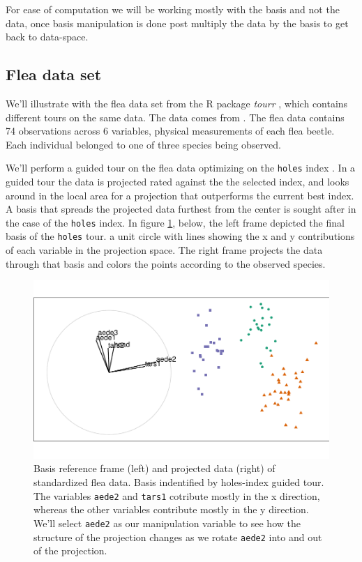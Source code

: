\documentclass{monashthesis}
\begin{document}
For ease of computation we will be working mostly with the basis and not the data, once basis manipulation is done post multiply the data by the basis to get back to data-space.

\hypertarget{flea-data-set}{%
\subsection{Flea data set}\label{flea-data-set}}

We'll illustrate with the flea data set from the R package \emph{tourr} \autocite{wickham_tourr_2011}, which contains different tours on the same data. The data comes from \textcite{lubischew_use_1962}. The flea data contains 74 observations across 6 variables, physical measurements of each flea beetle. Each individual belonged to one of three species being observed.

We'll perform a guided tour on the flea data optimizing on the \texttt{holes} index \autocite{cook_interactive_2007}. In a guided tour the data is projected rated against the the selected index, and looks around in the local area for a projection that outperforms the current best index. A basis that spreads the projected data furthest from the center is sought after in the case of the \texttt{holes} index. In figure \ref{fig:step0}, below, the left frame depicted the final basis of the \texttt{holes} tour. a unit circle with lines showing the x and y contributions of each variable in the projection space. The right frame projects the data through that basis and colors the points according to the observed species.

\begin{figure}
\centering
\includegraphics{thesis_files/figure-latex/step0-1.pdf}
\caption{\label{fig:step0}Basis reference frame (left) and projected data (right) of standardized flea data. Basis indentified by holes-index guided tour. The variables \texttt{aede2} and \texttt{tars1} cotribute mostly in the x direction, whereas the other variables contribute mostly in the y direction. We'll select \texttt{aede2} as our manipulation variable to see how the structure of the projection changes as we rotate \texttt{aede2} into and out of the projection.}
\end{figure}
\end{document}
